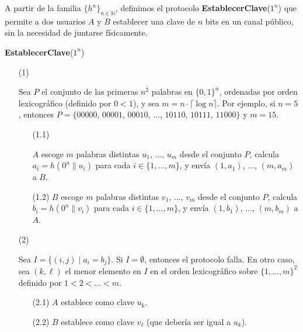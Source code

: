 A partir de la familia $\{h^n\}_{n \in \mathbb{N}}$, definimos el
protocolo {\bf EstablecerClave}($1^n$) que permite a dos usuarios $A$ y $B$
establecer una clave de $n$ bits en un canal público, sin la necesidad de juntarse físicamente.
\begin{flushleft}
{\bf EstablecerClave}($1^n$)
\begin{enumerate}

\item[(1)] \begin{minipage}[t]{\linewidth}
Sea $P$ el conjunto de las primeras $n^2$ palabras en $\{0,1\}^n$, ordenadas por orden lexicográfico (definido por $0 < 1$), y sea $m = n \cdot \lceil \log n \rceil$. Por ejemplo, si $n = 5$, entonces $P=\{00000$, $00001$, $00010$, $\ldots$, $10110$, $10111$, $11000 \}$ y $m = 15$.
\end{minipage}
\begin{enumerate}
\item[(1.1)] \begin{minipage}[t]{\linewidth} $A$ escoge $m$ palabras distintas $u_1$, $\ldots$, $u_m$ desde el conjunto $P$, calcula $a_i = h(0^n \| u_i)$ para cada $i \in \{1, \ldots, m\}$, y envía $(1,a_1)$, $\ldots$, $(m,a_m)$ a $B$.
\end{minipage}

\item[(1.2)] $B$ escoge $m$ palabras distintas $v_1$, $\ldots$, $v_m$ desde el conjunto $P$, calcula $b_i = h(0^n \| v_i)$ para cada $i \in \{1, \ldots, m\}$, y envía $(1, b_1)$, $\ldots$, $(m, b_m)$ a $A$.
\end{enumerate}
\item[(2)] \begin{minipage}[t]{\linewidth}
Sea $I = \{ (i,j) \mid a_i = b_j\}$. Si $I = \emptyset$, entonces el protocolo falla. En otro caso, sea $(k, \ell)$ el menor elemento en $I$ en el orden lexicográfico sobre $\{1, \ldots, m\}^2$ definido por $1 < 2 < \dots < m$.
\end{minipage}
\begin{enumerate}
\item[(2.1)] $A$ establece como clave $u_{k}$.
\item[(2.2)] $B$ establece como clave $v_\ell$ (que debería ser igual a $u_k$).
\end{enumerate}
\end{enumerate}
\end{flushleft}
